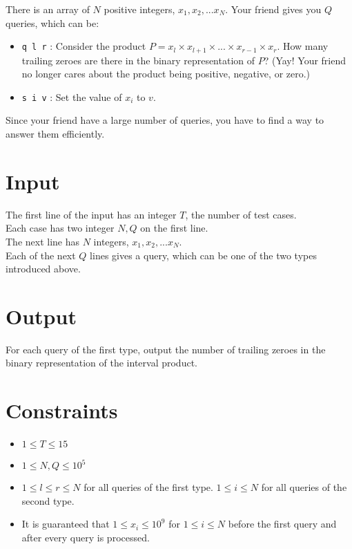 
There is an array of $N$ positive integers, $x_1, x_2, ... x_N$.
Your friend gives you $Q$ queries, which can be:
\begin{itemize}
\item {\tt q l r} : Consider the product $P = x_l \times x_{l+1} \times ... \times x_{r-1} \times x_r$. How many trailing zeroes are there in the binary representation of $P$? (Yay! Your friend no longer cares about the product being positive, negative, or zero.)
\item {\tt s i v} : Set the value of $x_i$ to $v$.
\end{itemize}
Since your friend have a large number of queries, you have to find a way to answer them efficiently.

\section*{Input}
The first line of the input has an integer $T$, the number of test cases.\\
Each case has two integer $N, Q$ on the first line.\\
The next line has $N$ integers, $x_1, x_2, ... x_N$.\\
Each of the next $Q$ lines gives a query, which can be one of the two types introduced above.

\section*{Output}

For each query of the first type, output the number of trailing zeroes in the binary representation of the interval product.

\section*{Constraints}
\begin{itemize}
\item $1 \leq T\leq 15$
\item $1 \leq N, Q \leq 10^5$
\item $1 \leq l \leq r \leq N$ for all queries of the first type. $1 \leq i \leq N$ for all queries of the second type.
\item It is guaranteed that $1 \leq x_i \leq 10^9$ for $1 \leq i \leq N$ before the first query and after every query is processed.
\end{itemize}

